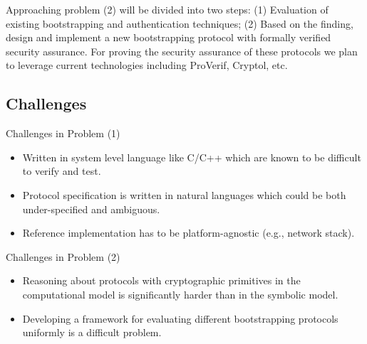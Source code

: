 \documentclass[10pt,a4paper]{article}
\begin{document}
Approaching problem (2) will be divided into two steps: (1) Evaluation of existing bootstrapping and authentication techniques; (2) Based on the finding, design and implement a new bootstrapping protocol with formally verified security assurance. For proving the security assurance of these protocols we plan to leverage 
current technologies including ProVerif, Cryptol, etc. 

\subsection*{Challenges} 
Challenges in Problem (1)
\begin{itemize}
\item Written in system level language like C/C++ which are known to be difficult to verify and test. 
\item Protocol specification is written in natural languages which could be both under-specified and ambiguous. 
\item Reference implementation has to be platform-agnostic (e.g., network stack). 
\end{itemize}
Challenges in Problem (2)
\begin{itemize}
\item Reasoning about protocols with cryptographic primitives in the computational model is significantly harder than in the symbolic model. 
\item Developing a framework for evaluating different bootstrapping protocols uniformly is a difficult problem.  
\end{itemize}



\end{document}
